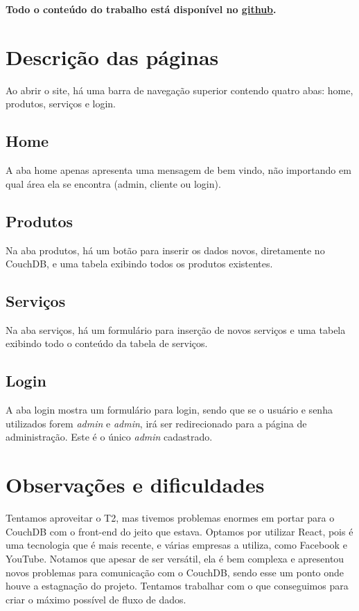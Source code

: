 \documentclass[10pt,a4paper]{article}
\begin{document}
\textbf{Todo o conteúdo do trabalho está disponível no \href{https://github.com/Adams123/Web2017}{github}.}
\section{Descrição das páginas}
Ao abrir o site, há uma barra de navegação superior contendo quatro abas: home, produtos, serviços e login.
\subsection{Home}
A aba home apenas apresenta uma mensagem de bem vindo, não importando em qual área ela se encontra (admin, cliente ou login).
\subsection{Produtos}
Na aba produtos, há um botão para inserir os dados novos, diretamente no CouchDB, e uma tabela exibindo todos os produtos existentes.
\subsection{Serviços}
Na aba serviços, há um formulário para inserção de novos serviços e uma tabela exibindo todo o conteúdo da tabela de serviços.
\subsection{Login}
A aba login mostra um formulário para login, sendo que se o usuário e senha utilizados forem \textit{admin} e \textit{admin}, irá ser redirecionado para a página de administração. Este é o único \textit{admin} cadastrado.
\section{Observações e dificuldades}
Tentamos aproveitar o T2, mas tivemos problemas enormes em portar para o CouchDB com o front-end do jeito que estava. Optamos por utilizar React, pois é uma tecnologia que é mais recente, e várias empresas a utiliza, como Facebook e YouTube. Notamos que apesar de ser versátil, ela é bem complexa e apresentou novos problemas para comunicação com o CouchDB, sendo esse um ponto onde houve a estagnação do projeto. Tentamos trabalhar com o que conseguimos para criar o máximo possível de fluxo de dados.
\end{document}
